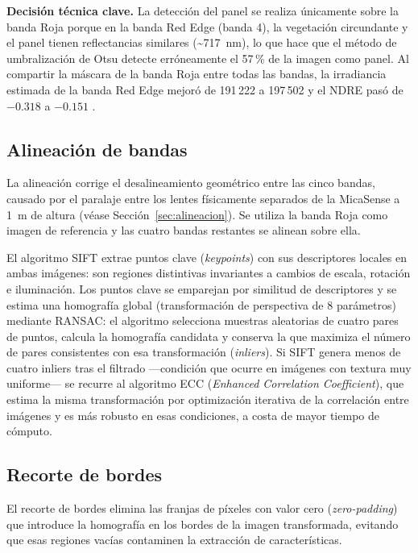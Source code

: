 \textbf{Decisión técnica clave.} La detección del panel se realiza únicamente
sobre la banda Roja porque en la banda Red Edge (banda 4), la vegetación
circundante y el panel tienen reflectancias similares (\textasciitilde717~nm),
lo que hace que el método de umbralización de Otsu detecte erróneamente
el 57\,\% de la imagen como panel. Al compartir la máscara de la banda Roja
entre todas las bandas, la irradiancia estimada de la banda Red Edge mejoró de
191\,222 a 197\,502 y el \ac{NDRE} pasó de $-0.318$ a $-0.151$
.

\subsection{Alineación de bandas}

La alineación corrige el desalineamiento geométrico entre las cinco bandas,
causado por el paralaje entre los lentes físicamente separados de la MicaSense
a \SI{1}{m} de altura (véase Sección~\ref{sec:alineacion}). Se utiliza la banda
Roja como imagen de referencia y las cuatro bandas restantes se alinean sobre ella.

El algoritmo \ac{SIFT} \cite{sift_lowe2004} extrae puntos clave
(\textit{keypoints}) con sus descriptores locales en ambas imágenes: son
regiones distintivas invariantes a cambios de escala, rotación e iluminación.
Los puntos clave se emparejan por similitud de descriptores y se estima una
homografía global (transformación de perspectiva de 8 parámetros) mediante
RANSAC: el algoritmo selecciona muestras aleatorias de cuatro pares de puntos,
calcula la homografía candidata y conserva la que maximiza el número de pares
consistentes con esa transformación (\textit{inliers}). Si \ac{SIFT} genera
menos de cuatro inliers tras el filtrado ---condición que ocurre en imágenes
con textura muy uniforme--- se recurre al algoritmo ECC
(\textit{Enhanced Correlation Coefficient}), que estima la misma transformación
por optimización iterativa de la correlación entre imágenes y es más robusto
en esas condiciones, a costa de mayor tiempo de cómputo.

\subsection{Recorte de bordes}

El recorte de bordes elimina las franjas de píxeles con valor cero
(\textit{zero-padding}) que introduce la homografía en los bordes de la imagen
transformada, evitando que esas regiones vacías contaminen la extracción de
características.

